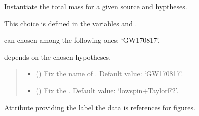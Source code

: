 \documentclass[letterpaper,10pt,english]{sphinxmanual}
\begin{document}
\begin{fulllineitems}
\label{\detokenize{source/api/setup_astro_mtot:nucleardatapy.setup_astro_mtot.SetupAstroMtot}}
\pysigstartsignatures
\pysiglinewithargsret
{}
{\sphinxparamcomma {}}
{}
\pysigstopsignatures
\sphinxAtStartPar
Instantiate the total mass for a given source and hyptheses.

\sphinxAtStartPar
This choice is defined in the variables  and .

\sphinxAtStartPar
{} can chosen among the following ones: ‘GW170817’.

\sphinxAtStartPar
{} depends on the chosen hypotheses.
\begin{quote}\begin{description}
\begin{itemize}
\item {} 
\sphinxAtStartPar
{} (\sphinxstyleliteralemphasis{\sphinxupquote{, }}) \textendash{} Fix the name of . Default value: ‘GW170817’.

\item {} 
\sphinxAtStartPar
{} (\sphinxstyleliteralemphasis{\sphinxupquote{, }}) \textendash{} Fix the . Default value: ‘low\sphinxhyphen{}spin+TaylorF2’.

\end{itemize}

\end{description}\end{quote}

\sphinxAtStartPar
{}

\begin{fulllineitems}
\label{\detokenize{source/api/setup_astro_mtot:nucleardatapy.setup_astro_mtot.SetupAstroMtot.label}}
\pysigstartsignatures
\pysigline
{}
\pysigstopsignatures
\sphinxAtStartPar
Attribute providing the label the data is references for figures.


\end{fulllineitems}
\end{fulllineitems}
\end{document}
